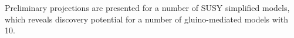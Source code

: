 Preliminary projections are presented for a number of SUSY simplified
models, which reveals discovery potential for a number of
gluino-mediated models with 10\fbinv.



